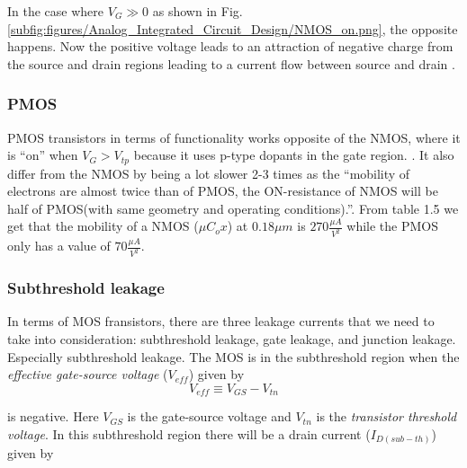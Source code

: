 In the case where $V_G\gg0$ as shown in Fig. \ref{subfig:figures/Analog_Integrated_Circuit_Design/NMOS_on.png}, the opposite happens. Now the positive voltage leads to an attraction of negative charge from the source and drain regions leading to a current flow between source and drain \cite[p. 16]{carusone_2012_analog}.




\subsubsection{PMOS}
PMOS transistors in terms of functionality works opposite of the NMOS, where it is ``on'' when $V_G > V_{tp}$ because it uses p-type dopants in the gate region. \cite{a2023_definition}. It also differ from the NMOS by being a lot slower 2-3 times as the ``mobility of electrons are almost twice than of PMOS, the ON-resistance of NMOS will be half of PMOS(with same geometry and operating conditions).''\cite{kusumitha_2019_why}. From table 1.5 \cite[p. 53]{carusone_2012_analog} we get that the mobility of a NMOS ($\mu C_ox$) at $0.18\mu m$ is $270\frac{\mu A}{V^2}$ while the PMOS only has a value of $70\frac{\mu A}{V^2}$.

\subsubsection{Subthreshold leakage}
In terms of MOS fransistors, there are three leakage currents that we need to take into consideration: subthreshold leakage, gate leakage, and junction leakage. \cite[p. 42]{carusone_2012_analog} Especially subthreshold leakage. The MOS is in the subthreshold region when the \textit{effective gate-source voltage} ($V_{eff}$) \cite[p. 17]{carusone_2012_analog} given by
\begin{equation}
    V_{eff}\equiv V_{GS}-V_{tn}
    \label{eq:effective_gate-source_voltage}
\end{equation}

is negative. Here $V_{GS}$ is the gate-source voltage and $V_{tn}$ is the \textit{transistor threshold voltage}. In this subthreshold region there will be a drain current ($I_{D(sub-th)}$) given by


